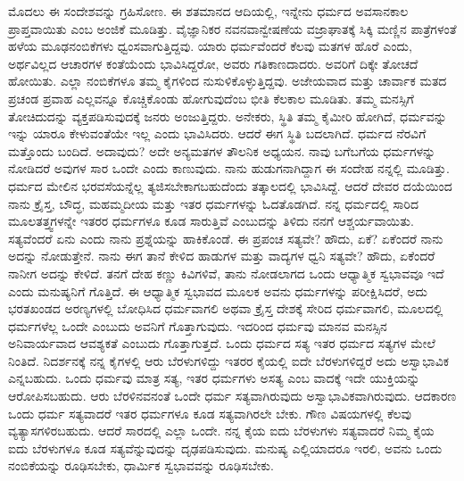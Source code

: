 ಮೊದಲು ಈ ಸಂದೇಶವನ್ನು ಗ್ರಹಿಸೋಣ. ಈ ಶತಮಾನದ ಆದಿಯಲ್ಲಿ, ಇನ್ನೇನು ಧರ್ಮದ ಅವಸಾನಕಾಲ ಪ್ರಾಪ್ತವಾಯಿತು ಎಂಬ ಅಂಜಿಕೆ ಮೂಡಿತ್ತು. ವೈಜ್ಞಾನಿಕರ ನವನವಾನ್ವೇಷಣೆಯ ವಜ್ರಾಘಾತಕ್ಕೆ ಸಿಕ್ಕಿ ಮಣ್ಣಿನ ಪಾತ್ರೆಗಳಂತೆ ಹಳೆಯ ಮೂಢನಂಬಿಕೆಗಳು ಧ್ವಂಸವಾಗುತ್ತಿದ್ದವು. ಯಾರು ಧರ್ಮವೆಂದರೆ ಕೆಲವು ಮತಗಳ ಹೊರೆ ಎಂದು, ಅರ್ಥವಿಲ್ಲದ ಆಚಾರಗಳ ಕಂತೆಯೆಂದು ಭಾವಿಸಿದ್ದರೋ, ಅವರು ಗತಿಕಾಣದಾದರು. ಅವರಿಗೆ ದಿಕ್ಕೇ ತೋಚದೆ ಹೋಯಿತು. ಎಲ್ಲಾ ನಂಬಿಕೆಗಳೂ ತಮ್ಮ ಕೈಗಳಿಂದ ನುಸುಳಿಕೊಳ್ಳುತ್ತಿದ್ದವು. ಅಜೇಯವಾದ ಮತ್ತು ಚಾರ್ವಾಕ ಮತದ ಪ್ರಚಂಡ ಪ್ರವಾಹ ಎಲ್ಲವನ್ನೂ ಕೊಚ್ಚಿಕೊಂಡು ಹೋಗುವುದೆಂಬ ಭೀತಿ ಕೆಲಕಾಲ ಮೂಡಿತು. ತಮ್ಮ ಮನಸ್ಸಿಗೆ ತೋಚಿದುದನ್ನು ವ್ಯಕ್ತಪಡಿಸುವುದಕ್ಕೆ ಜನರು ಅಂಜುತ್ತಿದ್ದರು. ಅನೇಕರು, ಸ್ಥಿತಿ ತಮ್ಮ ಕೈಮೀರಿ ಹೋಗಿದೆ, ಧರ್ಮವನ್ನು ಇನ್ನು ಯಾರೂ ಕೇಳುವಂತೆಯೇ ಇಲ್ಲ ಎಂದು ಭಾವಿಸಿದರು. ಆದರೆ ಈಗ ಸ್ಥಿತಿ ಬದಲಾಗಿದೆ. ಧರ್ಮದ ನೆರವಿಗೆ ಮತ್ತೊಂದು ಬಂದಿದೆ. ಅದಾವುದು? ಅದೇ ಅನ್ಯಮತಗಳ ತೌಲನಿಕ ಅಧ್ಯಯನ. ನಾವು ಬಗೆಬಗೆಯ ಧರ್ಮಗಳನ್ನು ನೋಡಿದರೆ ಅವುಗಳ ಸಾರ ಒಂದೇ ಎಂದು ಕಾಣುವುದು. ನಾನು ಹುಡುಗನಾಗಿದ್ದಾಗ ಈ ಸಂದೇಹ ನನ್ನಲ್ಲಿ ಮೂಡಿತ್ತು. ಧರ್ಮದ ಮೇಲಿನ ಭರವಸೆಯನ್ನೆಲ್ಲ ತ್ಯಜಿಸಬೇಕಾಗಬಹುದೆಂದು ತತ್ಕಾಲದಲ್ಲಿ ಭಾವಿಸಿದ್ದೆ. ಆದರೆ ದೇವರ ದಯೆಯಿಂದ ನಾನು ಕ್ರೈಸ್ತ, ಬೌದ್ಧ, ಮಹಮ್ಮದೀಯ ಮತ್ತು ಇತರ ಧರ್ಮಗಳನ್ನು ಓದತೊಡಗಿದೆ. ನನ್ನ ಧರ್ಮದಲ್ಲಿ ಸಾರಿದ ಮೂಲತತ್ತ್ವಗಳನ್ನೇ ಇತರರ ಧರ್ಮಗಳೂ ಕೂಡ ಸಾರುತ್ತಿವೆ ಎಂಬುದನ್ನು ತಿಳಿದು ನನಗೆ ಆಶ್ಚರ್ಯವಾಯಿತು. ಸತ್ಯವೆಂದರೆ ಏನು ಎಂದು ನಾನು ಪ್ರಶ್ನೆಯನ್ನು ಹಾಕಿಕೊಂಡೆ. ಈ ಪ್ರಪಂಚ ಸತ್ಯವೇ? ಹೌದು, ಏಕೆ? ಏಕೆಂದರೆ ನಾನು ಅದನ್ನು ನೋಡುತ್ತೇನೆ. ನಾನು ಈಗ ತಾನೆ ಕೇಳಿದ ಹಾಡುಗಳ ಮತ್ತು ವಾದ್ಯಗಳ ಧ್ವನಿ ಸತ್ಯವೇ? ಹೌದು, ಏಕೆಂದರೆ ನಾನೀಗ ಅದನ್ನು ಕೇಳಿದೆ. ತನಗೆ ದೇಹ ಕಣ್ಣು ಕಿವಿಗಳಿವೆ, ತಾನು ನೋಡಲಾಗದ ಒಂದು ಆಧ್ಯಾತ್ಮಿಕ ಸ್ವಭಾವವೂ ಇದೆ ಎಂದು ಮನುಷ್ಯನಿಗೆ ಗೊತ್ತಿದೆ. ಈ ಆಧ್ಯಾತ್ಮಿಕ ಸ್ವಭಾವದ ಮೂಲಕ ಅವನು ಧರ್ಮಗಳನ್ನು ಪರೀಕ್ಷಿಸಿದರೆ, ಅದು ಭರತಖಂಡದ ಅರಣ್ಯಗಳಲ್ಲಿ ಬೋಧಿಸಿದ ಧರ್ಮವಾಗಲಿ ಅಥವಾ ಕ್ರೈಸ್ತ ದೇಶಕ್ಕೆ ಸೇರಿದ ಧರ್ಮವಾಗಲಿ, ಮೂಲದಲ್ಲಿ ಧರ್ಮಗಳೆಲ್ಲ ಒಂದೇ ಎಂಬುದು ಅವನಿಗೆ ಗೊತ್ತಾಗುವುದು. ಇದರಿಂದ ಧರ್ಮವು ಮಾನವ ಮನಸ್ಸಿನ ಅನಿವಾರ್ಯವಾದ ಆವಶ್ಯಕತೆ ಎಂಬುದು ಗೊತ್ತಾಗುತ್ತದೆ. ಒಂದು ಧರ್ಮದ ಸತ್ಯ ಇತರ ಧರ್ಮದ ಸತ್ಯಗಳ ಮೇಲೆ ನಿಂತಿದೆ. ನಿದರ್ಶನಕ್ಕೆ ನನ್ನ ಕೈಗಳಲ್ಲಿ ಆರು ಬೆರಳುಗಳಿದ್ದು ಇತರರ ಕೈಯಲ್ಲಿ ಐದೇ ಬೆರಳುಗಳಿದ್ದರೆ ಅದು ಅಸ್ವಾಭಾವಿಕ ಎನ್ನಬಹುದು. ಒಂದು ಧರ್ಮವು ಮಾತ್ರ ಸತ್ಯ, ಇತರ ಧರ್ಮಗಳು ಅಸತ್ಯ ಎಂಬ ವಾದಕ್ಕೆ ಇದೇ ಯುಕ್ತಿಯನ್ನು ಆರೋಪಿಸಬಹುದು. ಆರು ಬೆರಳಿನವನಂತೆ ಒಂದೇ ಧರ್ಮ ಸತ್ಯವಾಗಿರುವುದು ಅಸ್ವಾಭಾವಿಕವಾಗಿರುವುದು. ಆದಕಾರಣ ಒಂದು ಧರ್ಮ ಸತ್ಯವಾದರೆ ಇತರ ಧರ್ಮಗಳೂ ಕೂಡ ಸತ್ಯವಾಗಿರಲೇ ಬೇಕು. ಗೌಣ ವಿಷಯಗಳಲ್ಲಿ ಕೆಲವು ವ್ಯತ್ಯಾಸಗಳಿರಬಹುದು. ಆದರೆ ಸಾರದಲ್ಲಿ ಎಲ್ಲಾ ಒಂದೇ. ನನ್ನ ಕೈಯ ಐದು ಬೆರಳುಗಳು ಸತ್ಯವಾದರೆ ನಿಮ್ಮ ಕೈಯ ಐದು ಬೆರಳುಗಳೂ ಕೂಡ ಸತ್ಯವೆನ್ನುವುದನ್ನು ದೃಢಪಡಿಸುವುದು. ಮನುಷ್ಯ ಎಲ್ಲಿಯಾದರೂ ಇರಲಿ, ಅವನು ಒಂದು ನಂಬಿಕೆಯನ್ನು ರೂಢಿಸಬೇಕು, ಧಾರ್ಮಿಕ ಸ್ವಭಾವವನ್ನು ರೂಢಿಸಬೇಕು.

